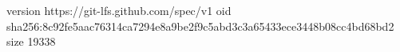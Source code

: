 version https://git-lfs.github.com/spec/v1
oid sha256:8c92fe5aac76314ca7294e8a9be2f9c5abd3c3a65433ece3448b08cc4bd68bd2
size 19338
